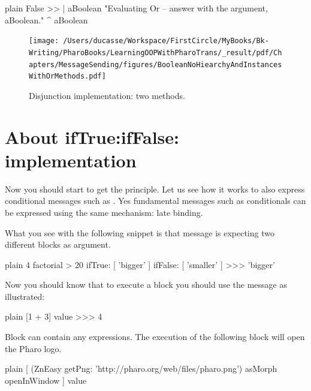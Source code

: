\documentclass[10pt,twoside,english]{_support/latex/sbabook/sbabook}
\begin{document}
\begin{displaycode}{plain}
False >> | aBoolean
   "Evaluating Or -- answer with the argument, aBoolean."
   ^ aBoolean
\end{displaycode}


\begin{figure}

\begin{center}
\texttt{[image: /Users/ducasse/Workspace/FirstCircle/MyBooks/Bk-Writing/PharoBooks/LearningOOPWithPharoTrans/\_result/pdf/Chapters/MessageSending/figures/BooleanNoHiearchyAndInstancesWithOrMethods.pdf]}\caption{Disjunction implementation: two methods.\label{/Users/ducasse/Workspace/FirstCircle/MyBooks/Bk-Writing/PharoBooks/LearningOOPWithPharoTrans/_result/pdf/Chapters/MessageSending/figures/BooleanNoHiearchyAndInstancesWithOrMethods.pdf}}\end{center}
\end{figure}

\section{About ifTrue:ifFalse: implementation}
Now you should start to get the principle. Let us see how it works to also express conditional messages such as . Yes fundamental messages such as conditionals can be expressed using the same mechanism: late binding.

What you see with the following snippet is that message  is expecting two different blocks as argument. 

\begin{displaycode}{plain}
4 factorial > 20
	ifTrue: [ 'bigger' ]
	ifFalse: [ 'smaller' ]
>>> 'bigger'
\end{displaycode}

Now you should know that to execute a block you should use the message  as illustrated:

\begin{displaycode}{plain}
[1 + 3] value
>>> 4
\end{displaycode}

Block can contain any expressions. The execution of the following block will open the Pharo logo.

\begin{displaycode}{plain}
[ (ZnEasy getPng: 'http://pharo.org/web/files/pharo.png')
       asMorph openInWindow ] value
\end{displaycode}
\end{document}
